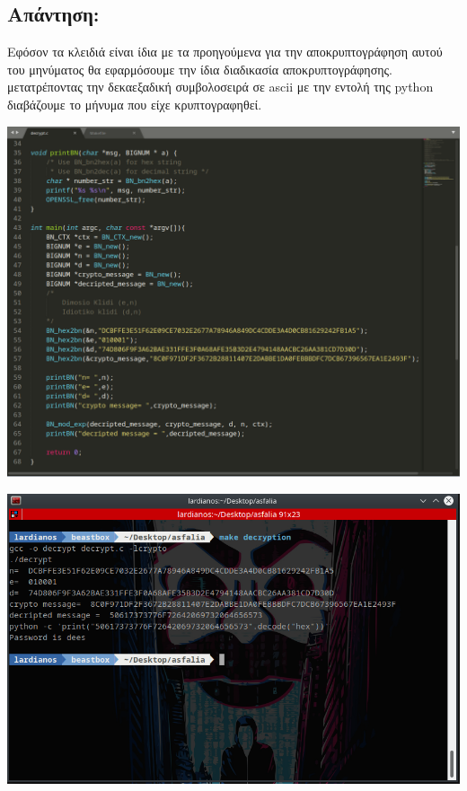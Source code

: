 \subsection*{Απάντηση:}
\noindent
Εφόσον τα κλειδιά είναι ίδια με τα προηγούμενα για την αποκρυπτογράφηση αυτού του μηνύματος
θα εφαρμόσουμε την ίδια διαδικασία αποκρυπτογράφησης. μετατρέποντας την δεκαεξαδική συμβολοσειρά
σε ascii με την εντολή της python διαβάζουμε το μήνυμα που είχε κρυπτογραφηθεί.
\begin{center}
			\includegraphics[width=1\textwidth]{image/image33code.PNG}		
\end{center}
\begin{center}
			\includegraphics[width=1\textwidth]{image/image33term.PNG}		
\end{center}


